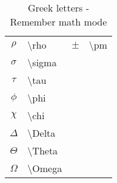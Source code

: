 \begin{table}[h]
\begin{tabular}{c l c l}
    $\rho$ & \textbackslash rho & $\pm$ & \textbackslash pm \\
    $\sigma$ & \textbackslash sigma & & \\
    $\tau$ & \textbackslash tau & & \\
    $\phi$ & \textbackslash phi & & \\
    $\chi$ & \textbackslash chi & & \\
    $\Delta$ & \textbackslash Delta & & \\
    $\Theta$ & \textbackslash Theta & & \\
    $\Omega$ & \textbackslash Omega & &
  \end{tabular}
  \caption{Greek letters - Remember math mode}
  \label{tab:greek-letters}
\end{table}

